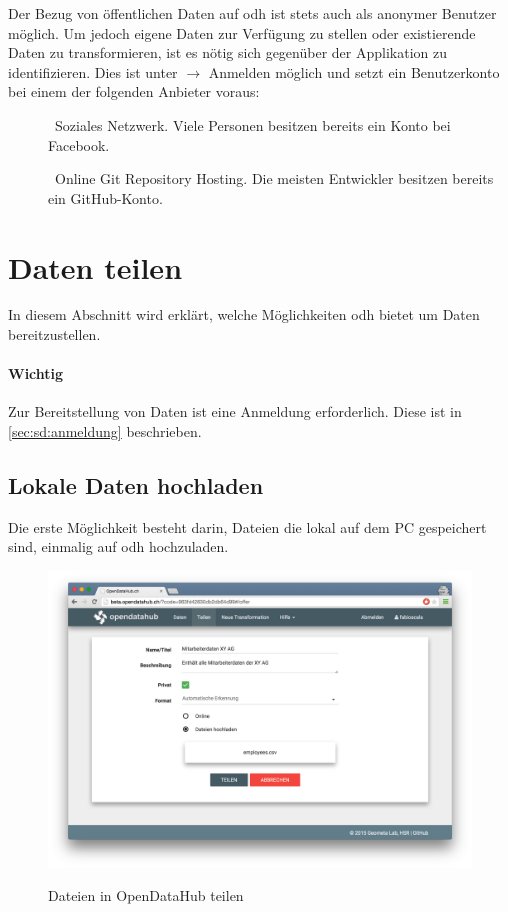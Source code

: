Der Bezug von öffentlichen Daten auf \acl{odh} ist stets auch als anonymer Benutzer möglich. Um jedoch eigene Daten zur Verfügung zu stellen oder existierende Daten zu transformieren, ist es nötig sich gegenüber der Applikation zu identifizieren. Dies ist unter  $\to$ Anmelden möglich und setzt ein Benutzerkonto bei einem der folgenden Anbieter voraus:

\begin{description}
\item[] \textendash\ Soziales Netzwerk. Viele Personen besitzen bereits ein Konto bei Facebook.
\item[] \textendash\ Online Git Repository Hosting. Die meisten Entwickler besitzen bereits ein GitHub-Konto.
\end{description}


\section{Daten teilen}

In diesem Abschnitt wird erklärt, welche Möglichkeiten \acl{odh} bietet um Daten bereitzustellen.

\paragraph{Wichtig} Zur Bereitstellung von Daten ist eine Anmeldung erforderlich. Diese ist in \vref{sec:sd:anmeldung} beschrieben.

\subsection{Lokale Daten hochladen}
\label{sec:sd:teilen-datei}
Die erste Möglichkeit besteht darin, Dateien die lokal auf dem PC gespeichert sind, einmalig auf \acl{odh} hochzuladen.

\begin{figure}[H]
	\centering
	\includegraphics[width=\linewidth]{fig/screenshot-teilen-datei}
	\label{fig:sd:screenshot-teilen-datei}
	\caption{Dateien in OpenDataHub teilen}
\end{figure}


